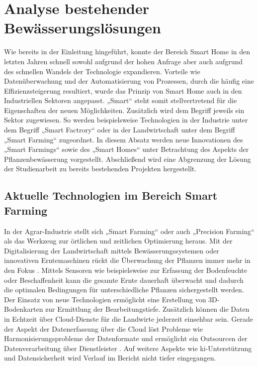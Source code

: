 \chapter{Analyse bestehender Bewässerungslösungen}

Wie bereits in der Einleitung hingeführt, konnte der Bereich Smart Home in den letzten Jahren schnell sowohl aufgrund der hohen Anfrage aber auch aufgrund des schnellen Wandels der Technologie expandieren. Vorteile wie Datenüberwachung und der Automatisierung von Prozessen, durch die häufig eine Effizienzsteigerung resultiert, wurde das Prinzip von Smart Home auch in den Industriellen Sektoren angepasst. „Smart“ steht somit stellvertretend für die Eigenschaften der neuen Möglichkeiten. Zusätzlich wird dem Begriff jeweils ein Sektor zugewiesen. So werden beispielsweise Technologien in der Industrie unter dem Begriff „Smart Factrory“ oder in der Landwirtschaft unter dem Begriff „Smart Farming“ zugeordnet. In diesem Absatz werden neue Innovationen des „Smart Farmings“ sowie des „Smart Homes“ unter Betrachtung des Aspekts der Pflanzenbewässerung vorgestellt. Abschließend wird eine Abgrenzung der Lösung der Studienarbeit zu bereits bestehenden Projekten hergestellt. 

\section{Aktuelle Technologien im Bereich Smart Farming}
In der Agrar-Industrie stellt sich „Smart Farming“ oder auch „Precision Farming“ als das Werkzeug zur örtlichen und zeitlichen Optimierung heraus. Mit der Digitalisierung der Landwirtschaft mittels Bewässerungssystemen oder innovativen Erntemaschinen rückt die Überwachung der Pflanzen immer mehr in den Fokus \cite{fingerPrecisionFarmingNexus2019}. Mittels Sensoren wie beispielsweise zur Erfassung der Bodenfeuchte oder Beschaffenheit kann die gesamte Ernte dauerhaft überwacht und dadurch die optimalen Bedingungen für unterschiedliche Pflanzen sichergestellt werden. Der Einsatz von neue Technologien ermöglicht eine Erstellung von 3D-Bodenkarten zur Ermittlung der Bearbeitungstiefe. Zusätzlich können die Daten in Echtzeit über Cloud-Dienste für die Landwirte jederzeit einsehbar sein. Gerade der Aspekt der Datenerfassung über die Cloud löst Probleme wie Harmonisierungsprobleme der Datenformate und ermöglicht ein Outsourcen der Datenverarbeitung über Dienstleister \cite[S. 33 ff.]{windischAgrarwissenschaftlichesSymposiumHans2016}. Auf weitere Aspekte wie \ac{ki}-Unterstützung und Datensicherheit wird Verlauf im Bericht nicht tiefer eingegangen. 

